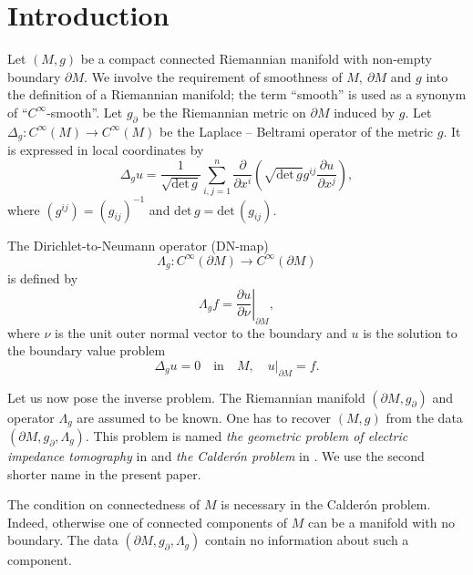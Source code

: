 \documentclass[12pt,reqno]{amsart}
\begin{document}
\section{Introduction}

Let $(M,g)$ be a compact connected Riemannian manifold with non-empty boundary $\partial M$. We involve the requirement of smoothness of
$M,\ \partial M$ and $g$ into the definition of a Riemannian manifold; the term ``smooth'' is used as a synonym of ``$C^\infty$-smooth''. Let $g_\partial$ be the Riemannian metric on $\partial M$ induced by $g$.
Let $\Delta_g:C^\infty(M)\to C^\infty(M)$ be the Laplace -- Beltrami operator of the metric $g$. It is expressed in local coordinates by
\begin{equation}
\Delta_gu=\frac{1}{\sqrt{\mbox{det}\,g}}
\sum\limits_{i,j=1}^n\frac{\partial}{\partial x^i}\left({\sqrt{\mbox{det}\,g}}g^{ij}\frac{\partial u}{\partial x^j}\right),
                                \label{1.1}
\end{equation}
where $(g^{ij})=(g_{ij})^{-1}$ and $\mbox{det}\,g=\mbox{det}\,(g_{ij})$.

The Dirichlet-to-Neumann operator (DN-map)
\begin{equation}
\Lambda_g:C^\infty(\partial M)\longrightarrow C^\infty(\partial M)
                                \label{1.2}
\end{equation}
is defined by
$$
\Lambda_gf=\left.\frac{\partial u}{\partial\nu}\right|_{\partial M},
$$
where $\nu$ is the unit outer normal vector to the boundary and $u$ is the solution to the boundary value problem
\begin{equation}
\Delta_gu=0\quad\mbox{in}\quad M,\quad u|_{\partial M}=f.
                                \label{1.3}
\end{equation}


Let us now pose the inverse problem. The Riemannian manifold
$(\partial M,g_\partial)$ and operator $\Lambda_g$ are assumed to be known. One has to recover $(M,g)$ from the data
$(\partial M,g_\partial,\Lambda_g)$.
This problem is named {\it the geometric problem of electric impedance tomography} in \cite{Sr2} and {\it the Calder\'{o}n problem} in \cite{Be}. We use the second shorter name in the present paper.

The condition on connectedness of $M$ is necessary in the Calder\'{o}n problem. Indeed, otherwise one of connected components of $M$ can be a manifold with no boundary. The data $(\partial M,g_\partial,\Lambda_g)$ contain no information about such a component.
\end{document}
